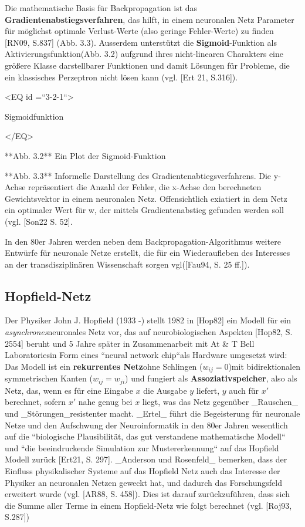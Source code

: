 Die mathematische Basis für Backpropagation ist das \textbf{Gradientenabstiegsverfahren}, das hilft, in einem neuronalen Netz Parameter für möglichst optimale Verlust-Werte (also geringe Fehler-Werte) zu finden [RN09, S.837] (Abb. 3.3)\footnotemark[14].  Ausserdem unterstützt die \textbf{Sigmoid}\footnotemark[15]-Funktion als Aktivierungsfunktion\footnotemark[16] (Abb. 3.2) aufgrund ihres nicht-linearen Charakters eine größere Klasse darstellbarer Funktionen und damit Lösungen für Probleme, die ein klassisches Perzeptron nicht lösen kann (vgl. [Ert 21, S.316])\footnotemark[17] \footnotemark[18].

<EQ id =``3-2-1``>

Sigmoidfunktion

</EQ>


**Abb. 3.2** Ein Plot der Sigmoid-Funktion


**Abb. 3.3** Informelle Darstellung des Gradientenabtiegsverfahrens. Die y-Achse repräsentiert die Anzahl der Fehler, die x-Achse den berechneten Gewichtsvektor in einem neuronalen Netz. Offensichtlich exiatiert in dem Netz ein optimaler Wert für w, der mittels Gradientenabstieg gefunden werden soll (vgl. [Son22 S. 52].

In den 80er Jahren werden neben dem Backpropagation-Algorithmus weitere Entwürfe für neuronale Netze erstellt, die für ein Wiederaufleben des Interesses an der transdisziplinären Wissenschaft sorgen vgl([Fau94, S. 25 ff.]).

\subsection{Hopfield-Netz}

Der Physiker John J. Hopfield (1933 -) stellt 1982 in [Hop82] ein Modell für ein \textit{asynchrones}\footnotemark[19] neuronales Netz vor, das auf neurobiologischen Aspekten [Hop82, S. 2554] beruht und 5 Jahre später in Zusammenarbeit mit At & T Bell Laboratories\footnotemark[20] in Form eines ``neural network chip``\footnotemark[21] [AR88, S. 457] als Hardware umgesetzt wird: Das Modell ist ein \textbf{rekurrentes Netz}\footnotemark[22] ohne Schlingen ($w_{ij} = 0$)\footnotemark[23] [Ert21, S. 291] mit bidirektionalen symmetrischen Kanten ($w_{ij} = w_{ji}$) und fungiert als \textbf{Assoziativspeicher}, also als Netz, das, wenn es für eine Eingabe $x$ die Ausgabe $y$ liefert, $y$ auch für $x'$ berechnet, sofern $x'$ nahe genug bei $x$ liegt\footnotemark[24] [Roj93, S. 251], was das Netz gegenüber _Rauschen_ und _Störungen_\footnotemark[25] resistenter macht.
_Ertel_ führt die Begeisterung für neuronale Netze und den Aufschwung der Neuroinformatik in den 80er Jahren wesentlich auf die ``biologische Plausibilität, das gut verstandene mathematische Modell`` und ``die beeindruckende Simulation zur Mustererkennung`` auf das Hopfield Modell zurück [Ert21, S. 297]. _Anderson und Rosenfeld_ bemerken, dass der Einfluss physikalischer Systeme auf das Hopfield Netz auch das Interesse der Physiker an neuronalen Netzen geweckt hat, und dadurch das Forschungsfeld erweitert wurde (vgl. [AR88, S. 458]). Dies ist darauf zurückzuführen, dass sich die Summe aller Terme in einem Hopfield-Netz wie folgt berechnet (vgl. [Roj93, S.287]\footnotemark[26])

